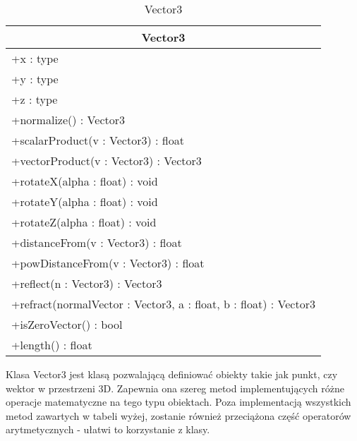 \footnotesize
\begin{longtable}{|p{14cm}|}
    \caption{Vector3} \label{tab:Vector3} \\ \hline
    \multicolumn{1}{|c|}{Vector3} \\ \hline
    +x : type \\
    +y : type \\
    +z : type \\
     \hline
	+normalize() : Vector3 \\ 
	+scalarProduct(v : Vector3) : float \\
	+vectorProduct(v : Vector3) : Vector3 \\
	+rotateX(alpha : float) : void \\
	+rotateY(alpha : float) : void \\
	+rotateZ(alpha : float) : void \\
	+distanceFrom(v : Vector3) : float \\
	+powDistanceFrom(v : Vector3) : float \\
	+reflect(n : Vector3) : Vector3 \\
	+refract(normalVector : Vector3, a : float, b : float) : Vector3 \\
	+isZeroVector() : bool \\
	+length() : float \\
	\hline
\end{longtable}
\normalsize

Klasa Vector3 jest klasą pozwalającą definiować obiekty takie jak punkt, czy wektor w przestrzeni 3D. Zapewnia ona szereg metod implementujących różne operacje matematyczne na tego typu obiektach. Poza implementacją wszystkich metod zawartych w tabeli wyżej, zostanie również przeciążona część operatorów arytmetycznych - ułatwi to korzystanie z klasy.
